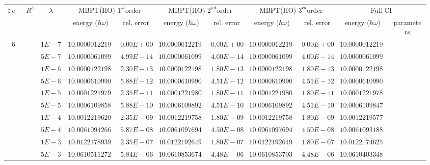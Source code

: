 \begin{landscape}
\begin{table}[ht]
\centering      %
{\tiny
\begin{tabular}[c]{c|c|c|c|c|c|c|c|c|c|c} 
\toprule[1pt]
\multicolumn{1}{c|}{$\sharp \; e^{-}$}  & \multicolumn{1}{c|}{$R^b$} & \multicolumn{1}{c|}{$\lambda$} & \multicolumn{2}{c|}{MBPT(HO)-$1^{st}$order}& \multicolumn{2}{c|}{MBPT(HO)-$2^{nd}$order}& \multicolumn{2}{c|}{MBPT(HO)-$3^{rd}$order}& \multicolumn{2}{c}{Full CI}\\
\multicolumn{1}{c|}{}  & \multicolumn{1}{c|}{} & \multicolumn{1}{c|}{} & \multicolumn{1}{c|}{energy ($\hbar \omega$)}& \multicolumn{1}{c|}{rel. error} & \multicolumn{1}{c|}{energy ($\hbar \omega$)}& \multicolumn{1}{c|}{rel. error}& \multicolumn{1}{c|}{energy ($\hbar \omega$)} &\multicolumn{1}{c|}{rel. error}& \multicolumn{1}{c|}{energy ($\hbar \omega$)}& \multicolumn{1}{c}{parameters}\\
\hline
\multirow{56}{*}{6} & &$1E-7$ & $10.000001221981$ & $0.00E+00$ & $10.000001221981$ & $0.00E+00$ & $10.000001221981$ & $0.00E+00$ & $10.000001221981$ & \\
& &$5E-7$ & $10.000006109906$ & $4.99E-14$ & $10.000006109906$ & $4.00E-14$ & $10.000006109906$ & $4.00E-14$ & $10.000006109906$ & \\
& &$1E-6$ & $10.000012219811$ & $2.30E-13$ & $10.000012219812$ & $1.80E-13$ & $10.000012219812$ & $1.80E-13$ & $10.000012219811$ & \\
& &$5E-6$ & $10.000061099016$ & $5.88E-12$ & $10.000061099051$ & $4.51E-12$ & $10.000061099051$ & $4.51E-12$ & $10.000061099005$ & \\
& &$1E-5$ & $10.000122197937$ & $2.35E-11$ & $10.000122198074$ & $1.80E-11$ & $10.000122198074$ & $1.80E-11$ & $10.000122197893$ & \\
& &$5E-5$ & $10.000610985844$ & $5.88E-10$ & $10.000610989272$ & $4.51E-10$ & $10.000610989272$ & $4.51E-10$ & $10.000610984766$ & \\
& &$1E-4$ & $10.001221962092$ & $2.35E-09$ & $10.001221975805$ & $1.80E-09$ & $10.001221975805$ & $1.80E-09$ & $10.001221957779$ & \\
& &$5E-4$ & $10.006109426662$ & $5.87E-08$ & $10.006109769452$ & $4.50E-08$ & $10.006109769455$ & $4.50E-08$ & $10.006109318814$ & \\
& &$1E-3$ & $10.012217893980$ & $2.35E-07$ & $10.012219264969$ & $1.80E-07$ & $10.012219264992$ & $1.80E-07$ & $10.012217462554$ & \\
& &$5E-3$ & $10.061051127218$ & $5.84E-06$ & $10.061085367457$ & $4.48E-06$ & $10.061085370310$ & $4.48E-06$ & $10.061040334895$ & \\

\end{tabular}}
\end{table}
\end{landscape}
